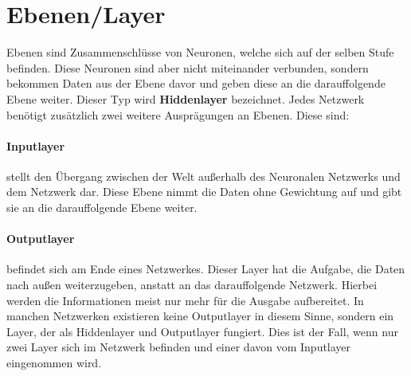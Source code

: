 \section{Ebenen/Layer}
\label{sec:Layer}

Ebenen sind Zusammenschlüsse von Neuronen, welche sich auf der selben Stufe befinden. 
Diese Neuronen sind aber nicht miteinander verbunden, sondern bekommen Daten aus der Ebene davor und geben diese an die darauffolgende Ebene weiter. 
Dieser Typ wird \textbf{Hiddenlayer} bezeichnet. 
Jedes Netzwerk benötigt zusätzlich zwei weitere Ausprägungen an Ebenen. 
Diese sind:

\paragraph{Inputlayer} stellt den Übergang zwischen der Welt außerhalb des Neuronalen Netzwerks und dem Netzwerk dar.
Diese Ebene nimmt die Daten ohne Gewichtung auf und gibt sie an die darauffolgende Ebene weiter. 

\paragraph{Outputlayer} befindet sich am Ende eines Netzwerkes. 
Dieser Layer hat die Aufgabe, die Daten nach außen weiterzugeben, anstatt an das darauffolgende Netzwerk. 
Hierbei werden die Informationen meist nur mehr für die Ausgabe aufbereitet. 
In manchen Netzwerken existieren keine Outputlayer in diesem Sinne, sondern ein Layer, der als Hiddenlayer und Outputlayer fungiert. 
Dies ist der Fall, wenn nur zwei Layer sich im Netzwerk befinden und einer davon vom Inputlayer eingenommen wird.
\\


